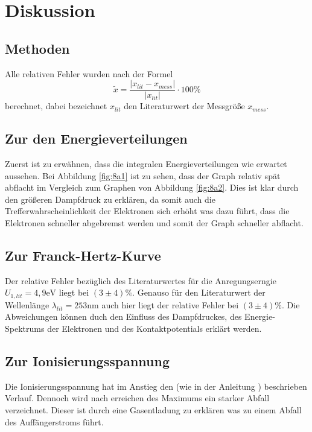 \section{Diskussion}
\label{sec:Diskussion}
\subsection{Methoden}
Alle relativen Fehler wurden nach der Formel
\begin{equation*}
  \tilde{x} = \frac{ \lvert x_{lit} - x_{mess} \rvert}{\lvert x_{lit} \rvert}
  \cdot 100 \%
\end{equation*}
berechnet, dabei bezeichnet $x_{lit}$ den Literaturwert der Messgröße $x_{mess}$.
\subsection{Zur den Energieverteilungen}
Zuerst ist zu erwähnen, dass die integralen Energieverteilungen wie erwartet aussehen.
Bei Abbildung \ref{fig:8a1} ist zu sehen, dass der Graph relativ spät abflacht im
Vergleich zum Graphen von Abbildung \ref{fig:8a2}. Dies ist klar durch den
größeren Dampfdruck zu erklären, da somit auch die Trefferwahrscheinlichkeit der
Elektronen sich erhöht was dazu führt, dass die Elektronen schneller abgebremst
werden und somit der Graph schneller abflacht.
\subsection{Zur Franck-Hertz-Kurve}
Der relative Fehler bezüglich des Literaturwertes \cite{wiki:fh} für die Anregungserngie
$U_{1,lit} = 4,9 \si{\eV} $ liegt bei $ \left(3 \pm 4 \right) \si{\percent} $.
Genauso für den Literaturwert \cite{wiki:fh} der Wellenlänge $ \lambda_{lit} = 253 \si{\nano \meter} $
auch hier liegt der relative Fehler bei $ \left(3 \pm 4 \right) \si{\percent} $.
Die Abweichungen können duch den Einfluss des Dampfdruckes, des Energie-Spektrums der Elektronen
und des Kontaktpotentials erklärt werden.
\subsection{Zur Ionisierungsspannung}
Die Ionisierungsspannung hat im Anstieg den (wie in der Anleitung \cite{Anleitung}) beschrieben
Verlauf. Dennoch wird nach erreichen des Maximums ein starker Abfall verzeichnet.
Dieser ist durch eine Gasentladung zu erklären was zu einem Abfall des Auffängerstroms führt.
